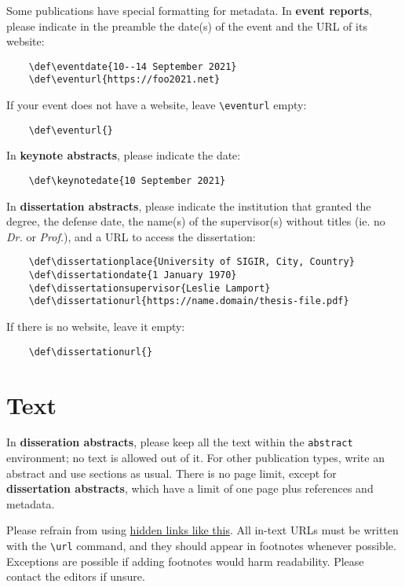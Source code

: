 \documentclass[news]{sigirforum}
\begin{document}
Some publications have special formatting for metadata. In \textbf{event reports}, please indicate in the preamble the date(s) of the event and the URL of its website:
\begin{verbatim}
    \def\eventdate{10--14 September 2021}
    \def\eventurl{https://foo2021.net}
\end{verbatim}
If your event does not have a website, leave \texttt{\textbackslash eventurl} empty:
\begin{verbatim}
    \def\eventurl{}
\end{verbatim}

In \textbf{keynote abstracts}, please indicate the date:
\begin{verbatim}
    \def\keynotedate{10 September 2021}
\end{verbatim}

In \textbf{dissertation abstracts}, please indicate the institution that granted the degree, the defense date, the name(s) of the supervisor(s) without titles (ie. no \textsl{Dr.} or \textsl{Prof.}), and a URL to access the dissertation:
\begin{verbatim}
    \def\dissertationplace{University of SIGIR, City, Country}
    \def\dissertationdate{1 January 1970}
    \def\dissertationsupervisor{Leslie Lamport}
    \def\dissertationurl{https://name.domain/thesis-file.pdf}
\end{verbatim}
If there is no website, leave it empty:
\begin{verbatim}
    \def\dissertationurl{}
\end{verbatim}

\section{Text}

In \textbf{disseration abstracts}, please keep all the text within the \texttt{abstract} environment; no text is allowed out of it. For other publication types, write an abstract and use sections as usual. There is no page limit, except for \textbf{dissertation abstracts}, which have a limit of one page plus references and metadata.

Please refrain from using \href{https://sigir.org}{hidden links like this}. All in-text URLs must be written with the \texttt{\textbackslash url} command, and they should appear in footnotes whenever possible. Exceptions are possible if adding footnotes would harm readability. Please contact the editors if unsure.
\end{document}
